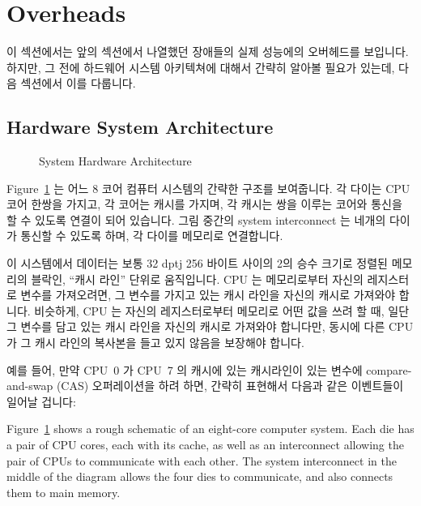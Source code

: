 
\section{Overheads}
\label{sec:cpu:Overheads}

이 섹션에서는 앞의 섹션에서 나열했던 장애들의 실제 성능에의 오버헤드를
보입니다.
하지만, 그 전에 하드웨어 시스템 아키텍쳐에 대해서 간략히 알아볼 필요가 있는데,
다음 섹션에서 이를 다룹니다.

\subsection{Hardware System Architecture}
\label{sec:cpu:Hardware System Architecture}

\begin{figure}[tb]
\centering
{}
\caption{System Hardware Architecture}
\label{fig:cpu:System Hardware Architecture}
\end{figure}

Figure~\ref{fig:cpu:System Hardware Architecture} 는 어느 8 코어 컴퓨터
시스템의 간략한 구조를 보여줍니다.
각 다이는 CPU 코어 한쌍을 가지고, 각 코어는 캐시를 가지며, 각 캐시는 쌍을
이루는 코어와 통신을 할 수 있도록 연결이 되어 있습니다.
그림 중간의 system interconnect 는 네개의 다이가 통신할 수 있도록 하며, 각
다이를 메모리로 연결합니다.

이 시스템에서 데이터는 보통 32 dptj 256 바이트 사이의 2의 승수 크기로 정렬된
메모리의 블락인, ``캐시 라인'' 단위로 움직입니다.
CPU 는 메모리로부터 자신의 레지스터로 변수를 가져오려면, 그 변수를 가지고
있는 캐시 라인을 자신의 캐시로 가져와야 합니다.
비슷하게, CPU 는 자신의 레지스터로부터 메모리로 어떤 값을 쓰려 할 때, 일단 그
변수를 담고 있는 캐시 라인을 자신의 캐시로 가져와야 합니다만, 동시에 다른 CPU
가 그 캐시 라인의 복사본을 들고 있지 않음을 보장해야 합니다.

예를 들어, 만약 CPU~0 가 CPU~7 의 캐시에 있는 캐시라인이 있는 변수에
compare-and-swap (CAS) 오퍼레이션을 하려 하면, 간략히 표현해서 다음과 같은
이벤트들이 일어날 겁니다:
\iffalse

Figure~\ref{fig:cpu:System Hardware Architecture}
shows a rough schematic of an eight-core computer system.
Each die has a pair of CPU cores, each with its cache, as well as an
interconnect allowing the pair of CPUs to communicate with each other.
The system interconnect in the middle of the diagram allows the
four dies to communicate, and also connects them to main memory.

